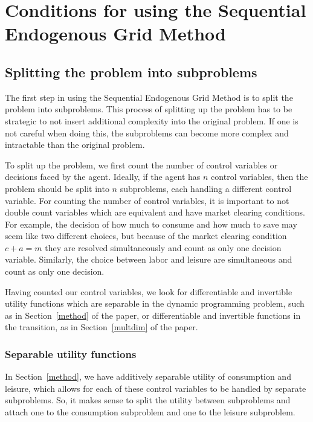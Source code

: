 \documentclass{article}
\newcommand{\cRat}{c}
\newcommand{\aRat}{a}
\newcommand{\mRat}{m}
\begin{document}
\section{Conditions for using the Sequential Endogenous Grid Method}\label{conditions}

\subsection{Splitting the problem into subproblems}\label{Splitting the problem into subproblems}

The first step in using the Sequential Endogenous Grid Method is to split the problem into subproblems. This process of splitting up the problem has to be strategic to not insert additional complexity into the original problem. If one is not careful when doing this, the subproblems can become more complex and intractable than the original problem.


To split up the problem, we first count the number of control variables or decisions faced by the agent. Ideally, if the agent has $n$ control variables, then the problem should be split into $n$ subproblems, each handling a different control variable. For counting the number of control variables, it is important to not double count variables which are equivalent and have market clearing conditions. For example, the decision of how much to consume and how much to save may seem like two different choices, but because of the market clearing condition $\cRat + \aRat = \mRat$ they are resolved simultaneously and count as only one decision variable. Similarly, the
choice between labor and leisure are simultaneous and count as only one decision.

Having counted our control variables, we look for differentiable and invertible utility functions which are separable in the dynamic programming problem, such as in Section~\ref{method} of the paper, or differentiable and invertible functions in the transition, as in Section~\ref{multdim} of the paper.


\subsubsection{Separable utility functions}\label{Separable utility functions}

In Section~\ref{method}, we have additively separable utility of consumption and leisure, which allows for each of these control variables to be handled by separate subproblems. So, it makes sense to split the utility between subproblems and attach one to the consumption subproblem and one to the leisure subproblem.
\end{document}

